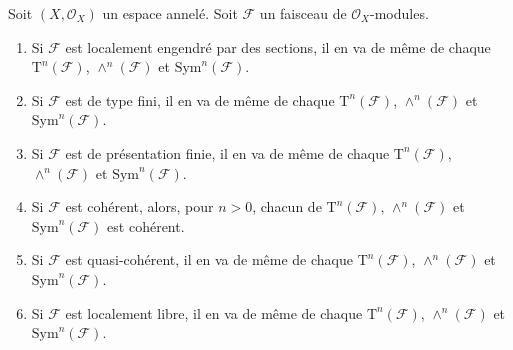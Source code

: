 \begin{lemma}
\label{lemma-tensor-algebra-permanence}
Soit $(X, \mathcal{O}_X)$ un espace annelé.
Soit $\mathcal{F}$ un faisceau de $\mathcal{O}_X$-modules.
\begin{enumerate}
\item Si $\mathcal{F}$ est localement engendré par des sections,
il en va de même de chaque $\text{T}^n(\mathcal{F})$,
$\wedge^n(\mathcal{F})$ et $\text{Sym}^n(\mathcal{F})$.
\item Si $\mathcal{F}$ est de type fini,
il en va de même de chaque $\text{T}^n(\mathcal{F})$,
$\wedge^n(\mathcal{F})$ et $\text{Sym}^n(\mathcal{F})$.
\item Si $\mathcal{F}$ est de présentation finie,
il en va de même de chaque $\text{T}^n(\mathcal{F})$,
$\wedge^n(\mathcal{F})$ et $\text{Sym}^n(\mathcal{F})$.
\item Si $\mathcal{F}$ est cohérent,
alors, pour $n > 0$, chacun de $\text{T}^n(\mathcal{F})$,
$\wedge^n(\mathcal{F})$ et $\text{Sym}^n(\mathcal{F})$
est cohérent.
\item Si $\mathcal{F}$ est quasi-cohérent,
il en va de même de chaque $\text{T}^n(\mathcal{F})$,
$\wedge^n(\mathcal{F})$ et $\text{Sym}^n(\mathcal{F})$.
\item Si $\mathcal{F}$ est localement libre,
il en va de même de chaque $\text{T}^n(\mathcal{F})$,
$\wedge^n(\mathcal{F})$ et $\text{Sym}^n(\mathcal{F})$.
\end{enumerate}
\end{lemma}

